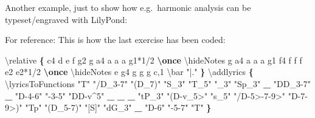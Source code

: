 \documentclass[
]{mecExercise}
\newenvironment{Shaded}{}{}
\newcommand{\DataTypeTok}[1]{\textcolor[rgb]{0.56,0.13,0.00}{#1}}
\newcommand{\FunctionTok}[1]{\textcolor[rgb]{0.02,0.16,0.49}{#1}}
\newcommand{\KeywordTok}[1]{\textcolor[rgb]{0.00,0.44,0.13}{\textbf{#1}}}
\newcommand{\NormalTok}[1]{#1}
\newcommand{\StringTok}[1]{\textcolor[rgb]{0.25,0.44,0.63}{#1}}
\begin{document}

\pagebreak



Another example, just to show how e.g.~harmonic analysis can be
typeset/engraved with LilyPond:


For reference: This is how the last exercise has been coded:

\begin{Shaded}
\begin{Highlighting}[]
\FunctionTok{\textbackslash{}relative} \KeywordTok{\{}
\NormalTok{  c\textquotesingle{}}\DataTypeTok{4}\NormalTok{ d e f}
\NormalTok{  g}\DataTypeTok{2}\NormalTok{ g}
\NormalTok{  a}\DataTypeTok{4}\NormalTok{ a a a}
\NormalTok{  g}\DataTypeTok{1*1/2} \KeywordTok{\textbackslash{}once} \FunctionTok{\textbackslash{}hideNotes}\NormalTok{ g}
\NormalTok{  a}\DataTypeTok{4}\NormalTok{ a a a}
\NormalTok{  g}\DataTypeTok{1}
\NormalTok{  f}\DataTypeTok{4}\NormalTok{ f f f}
\NormalTok{  e}\DataTypeTok{2}\NormalTok{ e}\DataTypeTok{2*1/2} \KeywordTok{\textbackslash{}once} \FunctionTok{\textbackslash{}hideNotes}\NormalTok{ e}
\NormalTok{  g}\DataTypeTok{4}\NormalTok{ g g g}
\NormalTok{  c,}\DataTypeTok{1}
  \FunctionTok{\textbackslash{}bar}\NormalTok{ "}\StringTok{|."}
\KeywordTok{\}}
\NormalTok{\textbackslash{}addlyrics}\KeywordTok{ \{}
  \FunctionTok{\textbackslash{}lyricsToFunctions}
\NormalTok{  "}\StringTok{T"}\NormalTok{ "}\StringTok{/D\_3{-}7"}\NormalTok{ "}\StringTok{(D\_7)"}\NormalTok{ "}\StringTok{S\_3"}
\NormalTok{  "}\StringTok{T\_5"}\NormalTok{ "}\StringTok{\_3"}
\NormalTok{  "}\StringTok{Sp\_3"} \KeywordTok{\_}\NormalTok{ "}\StringTok{DD\_3{-}7"} \KeywordTok{\_}
\NormalTok{  "}\StringTok{D{-}4{-}6"}\NormalTok{ "}\StringTok{{-}3{-}5"}
\NormalTok{  "}\StringTok{DD{-}v\^{}5"} \KeywordTok{\_} \KeywordTok{\_} \KeywordTok{\_}
\NormalTok{  "}\StringTok{tP\_3"}
\NormalTok{  "}\StringTok{(D{-}v\_5>"}\NormalTok{ "}\StringTok{s\_5"}\NormalTok{ "}\StringTok{/D{-}5>{-}7{-}9>"}\NormalTok{ "}\StringTok{D{-}7{-}9>)"}
\NormalTok{  "}\StringTok{Tp"}\NormalTok{ "}\StringTok{(D\_5{-}7)"}\NormalTok{ "}\StringTok{[S]"}
\NormalTok{  "}\StringTok{dG\_3"} \KeywordTok{\_}\NormalTok{ "}\StringTok{D{-}6"}\NormalTok{ "}\StringTok{{-}5{-}7"}
\NormalTok{  "}\StringTok{T"}
\KeywordTok{\}}
\end{Highlighting}
\end{Shaded}

\listofexercises
\end{document}
